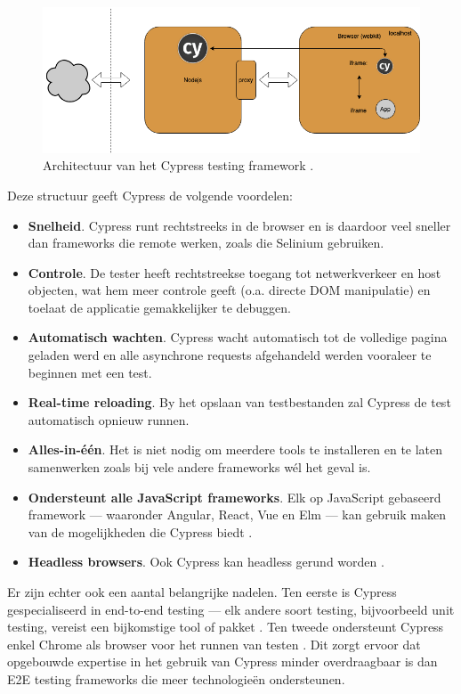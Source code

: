 \begin{figure}[h!]
    \centering
    \includegraphics[scale=0.4]{img/Vierbergen2019CypressArchitecture.png}
    \caption{Architectuur van het Cypress testing framework \autocite{Vierbergen2019}.}
    \label{fig:vierbergencypressarchitecture}
\end{figure}

Deze structuur geeft Cypress de volgende voordelen:
\begin{itemize}
    \item \textbf{Snelheid}. Cypress runt rechtstreeks in de browser en is daardoor veel sneller dan frameworks die remote werken, zoals die Selinium gebruiken.
    \item \textbf{Controle}. De tester heeft rechtstreekse toegang tot netwerkverkeer en host objecten, wat hem meer controle geeft (o.a. directe DOM manipulatie) en toelaat de applicatie gemakkelijker te debuggen.
    \item \textbf{Automatisch wachten}. Cypress wacht automatisch tot de volledige pagina geladen werd en alle asynchrone requests afgehandeld werden vooraleer te beginnen met een test.
    \item \textbf{Real-time reloading}. By het opslaan van testbestanden zal Cypress de test automatisch opnieuw runnen.
    \item \textbf{Alles-in-één}. Het is niet nodig om meerdere tools te installeren en te laten samenwerken zoals bij vele andere frameworks wél het geval is.
    \item \textbf{Ondersteunt alle JavaScript frameworks}. Elk op JavaScript gebaseerd framework — waaronder Angular, React, Vue en Elm — kan gebruik maken van de mogelijkheden die Cypress biedt \autocite{Karen2019}.
    \item \textbf{Headless browsers}. Ook Cypress kan headless gerund worden \autocite{Karen2019}.
\end{itemize}

Er zijn echter ook een aantal belangrijke nadelen. Ten eerste is Cypress gespecialiseerd in end-to-end testing — elk andere soort testing, bijvoorbeeld unit testing, vereist een bijkomstige tool of pakket \autocite{McPeak2018}. Ten tweede ondersteunt Cypress enkel Chrome als browser voor het runnen van testen \autocite{Leners2020}. Dit zorgt ervoor dat opgebouwde expertise in het gebruik van Cypress minder overdraagbaar is dan E2E testing frameworks die meer technologieën ondersteunen.

